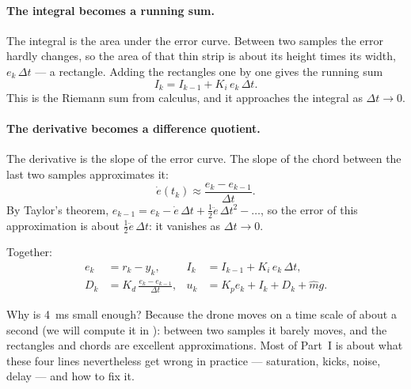 \paragraph{The integral becomes a running sum.} The integral is the area under the error curve. Between two samples the error hardly changes, so the area of that thin strip is about its height times its width, $e_k\,\Delta t$ — a rectangle. Adding the rectangles one by one gives the running sum
\begin{equation}
  I_k = I_{k-1} + K_i\,e_k\,\Delta t .
\end{equation}
This is the Riemann sum from calculus, and it approaches the integral as $\Delta t \to 0$.

\paragraph{The derivative becomes a difference quotient.} The derivative is the slope of the error curve. The slope of the chord between the last two samples approximates it:
\begin{equation}
  \dot e(t_k) \approx \frac{e_k - e_{k-1}}{\Delta t}.
\end{equation}
By Taylor's theorem, $e_{k-1} = e_k - \dot e\,\Delta t + \tfrac12\ddot e\,\Delta t^2 - \dots$, so the error of this approximation is about $\tfrac12\ddot e\,\Delta t$: it vanishes as $\Delta t \to 0$.

Together:
\begin{equation}\label{eq:meet-discrete}
\begin{aligned}
  e_k &= r_k - y_k, & I_k &= I_{k-1} + K_i\,e_k\,\Delta t,\\
  D_k &= K_d\,\frac{e_k - e_{k-1}}{\Delta t}, & u_k &= K_p e_k + I_k + D_k + \hat m g .
\end{aligned}
\end{equation}

Why is \SI{4}{ms} small enough? Because the drone moves on a time scale of about a second (we will compute it in ): between two samples it barely moves, and the rectangles and chords are excellent approximations. Most of Part~I is about what these four lines nevertheless get wrong in practice — saturation, kicks, noise, delay — and how to fix it.


